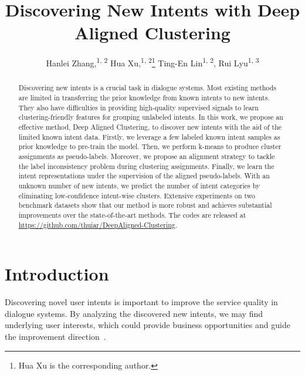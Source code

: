 \documentclass[letterpaper]{article} \usepackage{aaai21}  \usepackage{times}  \usepackage{helvet} \usepackage{courier}  \usepackage[hyphens]{url}  \usepackage{graphicx} \urlstyle{rm} \def\UrlFont{\rm}  \usepackage{natbib}  \usepackage{caption} \frenchspacing  \setlength{\pdfpagewidth}{8.5in}  \setlength{\pdfpageheight}{11in}  \usepackage{amsmath}
\title{Discovering New Intents with Deep Aligned Clustering}
\author{
	Hanlei Zhang,\textsuperscript{\rm 1, 2}
	Hua Xu,\textsuperscript{\rm 1, 2}\thanks{Hua Xu is the corresponding author.}
	Ting-En Lin\textsuperscript{\rm 1, 2},
	Rui Lyu\textsuperscript{\rm 1, 3}\\
}
\begin{document}
	\maketitle
\begin{abstract}
		Discovering new intents is a crucial task in dialogue systems. Most existing methods are limited in transferring the prior knowledge from known intents to new intents. They also have difficulties in providing high-quality supervised signals to learn clustering-friendly features for grouping unlabeled intents. In this work, we propose an effective method, Deep Aligned Clustering, to discover new intents with the aid of the limited known intent data. Firstly, we leverage a few labeled known intent samples as prior knowledge to pre-train the model. Then, we perform k-means to produce cluster assignments as pseudo-labels. Moreover, we propose an alignment strategy to tackle the label inconsistency problem during clustering assignments. Finally, we learn the intent representations under the supervision of the aligned pseudo-labels. With an unknown number of new intents, we predict the number of intent categories by eliminating low-confidence intent-wise clusters. Extensive experiments on two benchmark datasets show that our method is more robust and achieves substantial improvements over the state-of-the-art methods. The codes are released at \url{https://github.com/thuiar/DeepAligned-Clustering}.
	\end{abstract}
	
	\section{Introduction}
	Discovering novel user intents is important to improve the service quality in dialogue systems. By analyzing the discovered new intents, we may find underlying user interests, which could provide business opportunities and guide the improvement direction~\cite{lin-xu-2019-deep}. 
	
\end{document}
